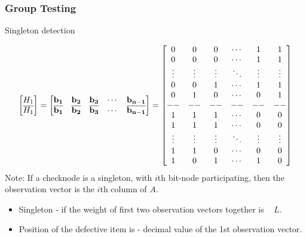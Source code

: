 	  \begin{frame}\frametitle{Group Testing}
				\begin{block}{Singleton detection}
				
				{ \tiny
		\[	\begin{bmatrix}
		H_1 \\
		\overline{H_1}
\end{bmatrix}	 =  \begin{bmatrix}
					\bf{b_1} & \bf{b_2} & \bf{b_3} & \cdots & \bf{b_{n-1}}\\
				   	\bf{\overline{b_1}} & \bf{\overline{b_2}} & \bf{\overline{b_3}} & \cdots & \bf{\overline{b_{n-1}}} \end{bmatrix} = \begin{bmatrix}
		0      & 0   & 0 & \cdots & 1 &  1 \\
		0      & 0   & 0 & \cdots & 1 &  1  \\
		\vdots & \vdots & \vdots & \ddots & \vdots & \vdots \\
		0      & 0   & 1 & \cdots & 1 &  1  \\
		0      & 1   & 0 & \cdots & 0 &  1  \\
		-- & -- & -- & -- & -- & --  \\
        1      & 1   & 1 & \cdots & 0 &  0 \\
		1      & 1   & 1 & \cdots & 0 &  0  \\
		\vdots & \vdots & \vdots & \ddots & \vdots & \vdots \\
		1      & 1   & 0 & \cdots & 0 &  0  \\
		1      & 0   & 1 & \cdots & 1 &  0  \\
		\end{bmatrix}
				   				   	 \]}
\alert{Note:} If a checknode is a singleton, with $i$th bit-node participating, then the observation vector is the $i$th column of $A$.

\begin{itemize}
\item Singleton - if the {\color{blue}weight of first two observation} vectors together is{ \ \color{blue} $L$}.
\item {\color{blue}Position} of the defective item is - {\color{blue} decimal value of the 1st observation vector}.
\end{itemize}    				
\end{block}					
					
\end{frame}
